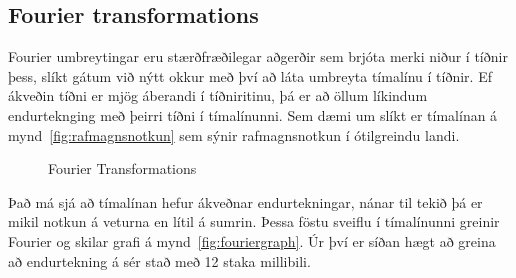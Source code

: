 \documentclass{article}
\begin{document}

\subsection{Fourier transformations} 

Fourier umbreytingar eru stærðfræðilegar aðgerðir
sem brjóta merki niður í tíðnir þess, slíkt gátum við nýtt okkur með því að láta
umbreyta tímalínu í tíðnir. 
Ef ákveðin tíðni er mjög áberandi í tíðniritinu, þá er að öllum líkindum
endurteknging með þeirri tíðni í tímalínunni. 
Sem dæmi um slíkt er tímalínan á mynd~\ref{fig:rafmagnsnotkun} sem sýnir
rafmagnsnotkun í ótilgreindu landi.


\begin{figure}[H]
  \centering 
  \caption{Fourier Transformations}
  \label{fig:fourier}
\end{figure}

Það má sjá að tímalínan hefur ákveðnar endurtekningar,
nánar til tekið þá er mikil notkun á veturna en lítil á sumrin.
Þessa föstu sveiflu í tímalínunni greinir Fourier og skilar grafi á mynd~\ref{fig:fouriergraph}. 
Úr því er síðan hægt að greina að endurtekning á sér stað með 12 staka
millibili.
\end{document}
